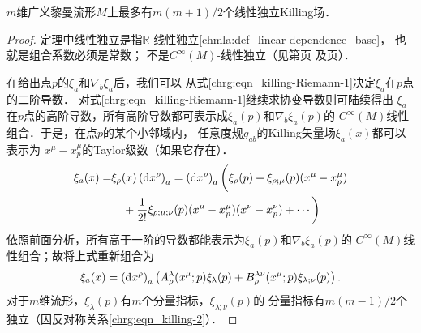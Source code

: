 \begin{theorem}\label{chrg:thm_killing-MAX}
    $m$维广义黎曼流形$M$上最多有$m(m+1)/2$个线性独立Killing场．
\end{theorem}
\begin{proof}
    定理中线性独立是指$\mathbb{R}$-线性独立\ref{chmla:def_linear-dependence_base}，
    也就是组合系数必须是常数；
    不是$C^\infty(M)$-线性独立（见第\pageref{chdm:eqn_functimesv}页
    及\pageref{chdm:thm_Tensor-Characterization-Lemma}页）．

    在给出点$p$的$\xi_a$和$\nabla_b\xi_a$后，我们可以
    从式\eqref{chrg:eqn_killing-Riemann-1}决定$\xi_a$在$p$点的二阶导数．
    对式\eqref{chrg:eqn_killing-Riemann-1}继续求协变导数则可陆续得出
    $\xi_a$在$p$点的高阶导数，所有高阶导数都可表示成$\xi_a(p)$和$\nabla_b\xi_a(p)$的
    $C^\infty(M)$线性组合．于是，在点$p$的某个小邻域内，
    任意度规$g_{ab}$的Killing矢量场$\xi_a(x)$都可以表示为
    $x^\mu-x^\mu_p$的Taylor级数（如果它存在）．
    \begin{align*}
        \xi_a(x)=&\xi_\rho(x) \left({\rm d}x^\rho\right)_a
        = \left({\rm d}x^\rho\right)_a \bigg( \xi_\rho(p)+
         \xi_{\rho;\mu}(p) (x^\mu -x_p^\mu) \\
        &\quad + \frac{1}{2!}\xi_{\rho;\mu;\nu}(p) (x^\mu -x_p^\mu)(x^\nu -x_p^\nu)
        +\cdots         \bigg)
    \end{align*}
    依照前面分析，所有高于一阶的导数都能表示为$\xi_a(p)$和$\nabla_b\xi_a(p)$的
    $C^\infty(M)$线性组合；故将上式重新组合为
    \begin{equation}\label{chrg:eqn_tmpkillnum}
        \xi_a(x)= \left({\rm d}x^\rho\right)_a
        \left(A_\rho^\lambda(x^\mu;p) \xi_\lambda(p)+
        B_\rho^{\lambda\nu}(x^\mu;p) \xi_{\lambda;\nu}(p) \right).
    \end{equation}
    对于$m$维流形，$\xi_\lambda(p)$有$m$个分量指标，$\xi_{\lambda;\nu}(p)$的
    分量指标有$m(m-1)/2$个独立（因反对称关系\eqref{chrg:eqn_killing-2}）．


\end{proof}

